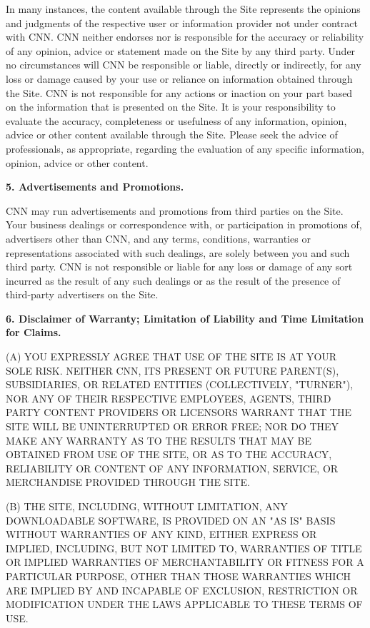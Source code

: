 In many instances, the content available through the Site represents the
opinions and judgments of the respective user or information provider
not under contract with CNN. CNN neither endorses nor is responsible for
the accuracy or reliability of any opinion, advice or statement made on
the Site by any third party. Under no circumstances will CNN be
responsible or liable, directly or indirectly, for any loss or damage
caused by your use or reliance on information obtained through the Site.
CNN is not responsible for any actions or inaction on your part based on
the information that is presented on the Site. It is your responsibility
to evaluate the accuracy, completeness or usefulness of any information,
opinion, advice or other content available through the Site. Please seek
the advice of professionals, as appropriate, regarding the evaluation of
any specific information, opinion, advice or other content.

\textbf{5. Advertisements and Promotions.}

CNN may run advertisements and promotions from third parties on the
Site. Your business dealings or correspondence with, or participation in
promotions of, advertisers other than CNN, and any terms, conditions,
warranties or representations associated with such dealings, are solely
between you and such third party. CNN is not responsible or liable for
any loss or damage of any sort incurred as the result of any such
dealings or as the result of the presence of third-party advertisers on
the Site.

\textbf{6. Disclaimer of Warranty; Limitation of Liability and Time
Limitation for Claims.}

(A) YOU EXPRESSLY AGREE THAT USE OF THE SITE IS AT YOUR SOLE RISK.
NEITHER CNN, ITS PRESENT OR FUTURE PARENT(S), SUBSIDIARIES, OR RELATED
ENTITIES (COLLECTIVELY, "TURNER"), NOR ANY OF THEIR RESPECTIVE
EMPLOYEES, AGENTS, THIRD PARTY CONTENT PROVIDERS OR LICENSORS WARRANT
THAT THE SITE WILL BE UNINTERRUPTED OR ERROR FREE; NOR DO THEY MAKE ANY
WARRANTY AS TO THE RESULTS THAT MAY BE OBTAINED FROM USE OF THE SITE, OR
AS TO THE ACCURACY, RELIABILITY OR CONTENT OF ANY INFORMATION, SERVICE,
OR MERCHANDISE PROVIDED THROUGH THE SITE.

(B) THE SITE, INCLUDING, WITHOUT LIMITATION, ANY DOWNLOADABLE SOFTWARE,
IS PROVIDED ON AN "AS IS" BASIS WITHOUT WARRANTIES OF ANY KIND, EITHER
EXPRESS OR IMPLIED, INCLUDING, BUT NOT LIMITED TO, WARRANTIES OF TITLE
OR IMPLIED WARRANTIES OF MERCHANTABILITY OR FITNESS FOR A PARTICULAR
PURPOSE, OTHER THAN THOSE WARRANTIES WHICH ARE IMPLIED BY AND INCAPABLE
OF EXCLUSION, RESTRICTION OR MODIFICATION UNDER THE LAWS APPLICABLE TO
THESE TERMS OF USE.

